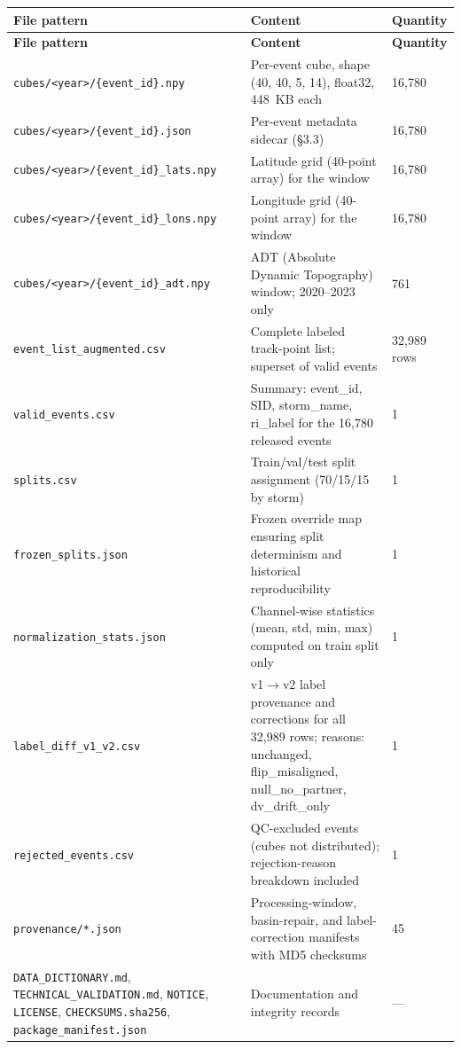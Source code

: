 \documentclass[11pt]{article}
\begin{document}
{\small
\begin{longtable}{L{5.3cm} L{7.7cm} L{2.0cm}}
\toprule
\textbf{File pattern} & \textbf{Content} & \textbf{Quantity} \\
\midrule
\endfirsthead
\toprule
\textbf{File pattern} & \textbf{Content} & \textbf{Quantity} \\
\midrule
\endhead
\texttt{cubes/<year>/\allowbreak\{event\_id\}.npy} & Per-event cube, shape (40, 40, 5, 14), float32, 448~KB each & 16{,}780 \\
\addlinespace
\texttt{cubes/<year>/\allowbreak\{event\_id\}.json} & Per-event metadata sidecar (\S3.3) & 16{,}780 \\
\addlinespace
\texttt{cubes/<year>/\allowbreak\{event\_id\}\_lats.npy} & Latitude grid (40-point array) for the window & 16{,}780 \\
\addlinespace
\texttt{cubes/<year>/\allowbreak\{event\_id\}\_lons.npy} & Longitude grid (40-point array) for the window & 16{,}780 \\
\addlinespace
\texttt{cubes/<year>/\allowbreak\{event\_id\}\_adt.npy} & ADT (Absolute Dynamic Topography) window; 2020--2023 only & 761 \\
\addlinespace
\texttt{event\_list\_augmented.csv} & Complete labeled track-point list; superset of valid events & 32{,}989 rows \\
\addlinespace
\texttt{valid\_events.csv} & Summary: event\_id, SID, storm\_name, ri\_label for the 16{,}780 released events & 1 \\
\addlinespace
\texttt{splits.csv} & Train/val/test split assignment (70/15/15 by storm) & 1 \\
\addlinespace
\texttt{frozen\_splits.json} & Frozen override map ensuring split determinism and historical reproducibility & 1 \\
\addlinespace
\texttt{normalization\_stats.json} & Channel-wise statistics (mean, std, min, max) computed on train split only & 1 \\
\addlinespace
\texttt{label\_diff\_v1\_v2.csv} & v1$\to$v2 label provenance and corrections for all 32{,}989 rows; reasons: unchanged, flip\_misaligned, null\_no\_partner, dv\_drift\_only & 1 \\
\addlinespace
\texttt{rejected\_events.csv} & QC-excluded events (cubes not distributed); rejection-reason breakdown included & 1 \\
\addlinespace
\texttt{provenance/*.json} & Processing-window, basin-repair, and label-correction manifests with MD5 checksums & 45 \\
\addlinespace
\texttt{DATA\_DICTIONARY.md}, \texttt{TECHNICAL\_VALIDATION.md}, \texttt{NOTICE}, \texttt{LICENSE}, \texttt{CHECKSUMS.sha256}, \texttt{package\_manifest.json} & Documentation and integrity records & --- \\
\bottomrule
\end{longtable}
}
\end{document}
